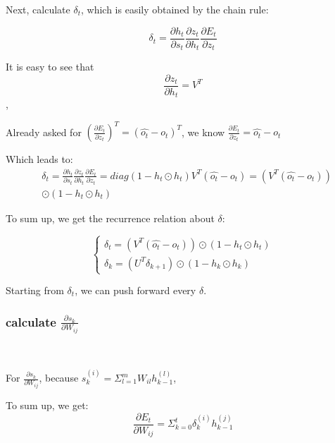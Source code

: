 \documentclass[oneside,solution]{seu-ml-assign}
\begin{document}
Next, calculate $\delta_t$, which is easily obtained by the chain rule:

\begin{equation}\delta_t=\frac{\partial h_t}{\partial s_t}\frac{\partial z_t}{\partial h_t}\frac{\partial E_t}{\partial z_t}\end{equation}

It is easy to see that \begin{equation}\frac{\partial z_t}{\partial h_t}=V^T\end{equation},

Already asked for $(\frac{\partial E_{t}}{\partial z_{t}})^{T}=(\hat{o_{t}}-o_{t})^{T}$, we know $\frac{\partial E_{t}}{\partial z_{t}}=\hat{o_{t}}-o_{t}$

Which leads to:
\begin{equation}\begin{aligned} & \delta_t=\frac{\partial h_t}{\partial s_t}\frac{\partial z_t}{\partial h_t}\frac{\partial E_t}{\partial z_t}
               =diag(1-h_t\odot h_t)V^T(\hat{o_t}-o_t)=(V^T(\hat{o_t}-o_t))                                                    \\&\odot(1-h_t\odot h_t)\end{aligned}\end{equation}

To sum up, we get the recurrence relation about $\delta$:

\begin{equation}\left.\left\{\begin{array}{l}\delta_t=(V^T(\hat{o_t}-o_t))\odot(1-h_t\odot h_t)\\\delta_k=(U^T\delta_{k+1})\odot(1-h_k\odot h_k)\end{array}\right.\right.\end{equation}

Starting from $\delta_t$, we can push forward every $\delta$.

\subsubsection{calculate $\frac{\partial s_k }{ \partial W_{ij} }$}
\

For $\frac{\partial s_k }{ \partial W_{ij} }$, because $s_k^{(i)}=\Sigma_{l=1}^mW_{il}h_{k-1}^{(l)}$,


To sum up, we get:
\begin{equation}\frac{\partial E_t}{\partial W_{ij}}=\Sigma_{k=0}^t\delta_k^{(i)}h_{k-1}^{(j)}\end{equation}
\end{document}
